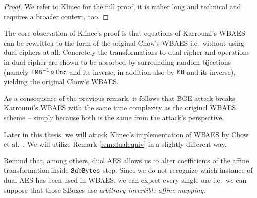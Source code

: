 	\begin{proof}
		We refer to Klinec \cite{klinec2013white} for the full proof, it is rather long and technical and requires a broader context, too.
	\end{proof}
	
	\begin{remark}
	\label{rem:dualequiv}
		The core observation of Klinec's proof is that equations of Karroumi's WBAES can be rewritten to the form of the original Chow's WBAES i.e.\ without using dual ciphers at all. Concretely the transformations to dual cipher and operations in dual cipher are shown to be absorbed by surrounding random bijections (namely $\texttt{IMB}^{-1}\circ\texttt{Enc}$ and its inverse, in addition also by $\texttt{MB}$ and its inverse), yielding the original Chow's WBAES.
	\end{remark}
	
	As a consequence of the previous remark, it follows that BGE attack breaks Karroumi's WBAES with the same time complexity as the original WBAES scheme -- simply because both is the same from the attack's perspective.
	
	\begin{note}
	\label{note:dualsbox}
		Later in this thesis, we will attack Klinec's implementation \cite{klinec2013implementation} of WBAES by Chow et al.\ \cite{chow2002aes}. We will utilize Remark \ref{rem:dualequiv} in a slightly different way.
		
		Remind that, among others, dual AES allows us to alter coefficients of the affine transformation inside $\texttt{SubBytes}$ step. Since we do not recognize which instance of dual AES has been used in WBAES, we can expect every single one i.e.\ we can suppose that those SBoxes use {\em arbitrary invertible affine mapping}.
	\end{note}
	
